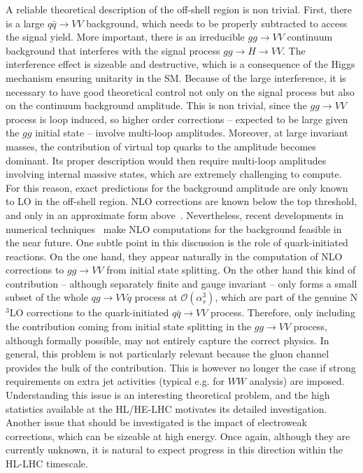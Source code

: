 A reliable theoretical description of the off-shell region is non trivial. First, there is a large
$q\bar q \to VV$ background, which needs to be properly subtracted to access the signal yield. 
More important, there is an irreducible $gg\to VV $ continuum background that interferes with the
signal process $gg\to H\to VV$. The interference effect is sizeable and destructive, which is a 
consequence of the Higgs mechanism ensuring unitarity in the SM. Because of the large interference,
it is necessary to have
good theoretical control not only on the signal process but also on the continuum background 
amplitude. This is non trivial, since the $gg\to VV$ process is loop induced, so higher order
corrections -- expected to be large given the $gg$ initial state -- involve multi-loop amplitudes.
Moreover, at large invariant masses, the contribution of virtual top quarks to the amplitude becomes
dominant. Its proper description would then require multi-loop amplitudes involving internal massive
states, which are extremely challenging to compute. For this reason, exact predictions for the
background amplitude are only known to LO in the off-shell region. NLO corrections are known below
the top threshold, and only in an approximate form 
above~\cite{Caola:2016trd,Campbell:2016ivq,Campbell:2014gua,Caola:2015psa,Caola:2015rqy,Bonvini:2013jha,Alioli:2016xab}. 
Nevertheless, recent developments in 
numerical techniques~\cite{Borowka:2016ehy} 
make NLO computations for the background feasible in the near
future. One subtle point in this discussion is the role of quark-initiated reactions. On the one
hand, they appear naturally in the computation of NLO corrections to $gg\to VV$ from initial
state splitting. On the other hand this kind of contribution -- although separately finite and 
gauge invariant -- only forms a small subset of the whole $qg \to VV q$ process at 
$\mathcal O(\alpha_s^3)$, which are part of the genuine N$^3$LO corrections to the 
quark-initiated $q\bar q\to VV$ process. Therefore, only including  
the contribution coming from initial
state splitting in the $gg\to VV$ process, although formally possible, may not entirely
capture the correct physics. In general, this problem is not particularly relevant because
the gluon channel provides the bulk of the contribution. This is however no longer the case if
strong requirements on extra jet activities (typical e.g. for $WW$ analysis) are imposed. 
Understanding this issue is an interesting theoretical problem, and the high statistics
available at the HL/HE-LHC motivates its detailed investigation. Another issue that should be 
investigated is the impact of electroweak corrections, which can be sizeable at high energy. Once again, 
although they are currently unknown, it is natural to expect progress in this direction within the HL-LHC timescale. 

